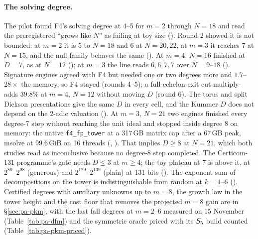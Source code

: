 \paragraph{The solving degree.} The pilot found F4's solving degree at
4--5 for $m=2$ through $N=18$ and read the preregistered ``grows like $N$''
as failing at toy size (). Round 2
showed it is not bounded: at $m=2$ it is 5 to $N=18$ and 6 at $N=20,22$, at
$m=3$ it reaches 7 at $N=15$, and the null family behaves the same
(). At $m=4$, $N=16$ finished at
$D=7$, as at $N=12$ (); at $m=3$
the line reads $6,6,7,7$ over $N=9$--$18$
(). Signature engines agreed with
F4 but needed one or two degrees more and $1.7$--$28\times$ the memory, so F4
stayed (rounds 4--5); a full-echelon exit cut multiply-adds $39.8\%$ at
$m=4$, $N=12$ without moving $D$ (round 6). The torus and split Dickson
presentations give the same $D$ in every cell, and the Kummer $D$ does not
depend on the 2-adic valuation ().
At $m=3$, $N=21$ two engines finished every degree-7 step without reaching
the unit ideal and stopped inside degree 8 on memory: the native
\texttt{f4\_fp\_tower} at a 317\,GB matrix cap after a 67\,GB peak, msolve at
99.6\,GiB on 16 threads (,
). That implies $D\ge8$ at
$N=21$, which both studies read as inconclusive because no degree-8 step
completed. The Certicom-131 programme's gate needs $D\le3$ at $m\ge4$; the
toy plateau at 7 is above it, at $2^{89}$--$2^{98}$ (generous) and
$2^{129}$--$2^{139}$ (plain) at 131 bits
(). The exponent sum of decompositions
on the tower is indistinguishable from random at $k=1$--$6$
(). Certified degrees with auxiliary
unknowns up to $m=8$, the growth law in the tower height and the cost floor
that removes the projected $m=8$ gain are in \S\ref{sec:pa-pkm}, with the last fall degrees at $m=2$--6 measured on
15 November (Table~\ref{tab:pa-dfm}) and the symmetric oracle priced with its
$S_{5}$ build counted (Table~\ref{tab:pa-pkm-priced}).

